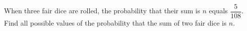 When three fair dice are rolled, the probability that their sum is $n$ equals $\dfrac5{108}$. Find all possible values of the probability that the sum of two fair dice is $n$.
